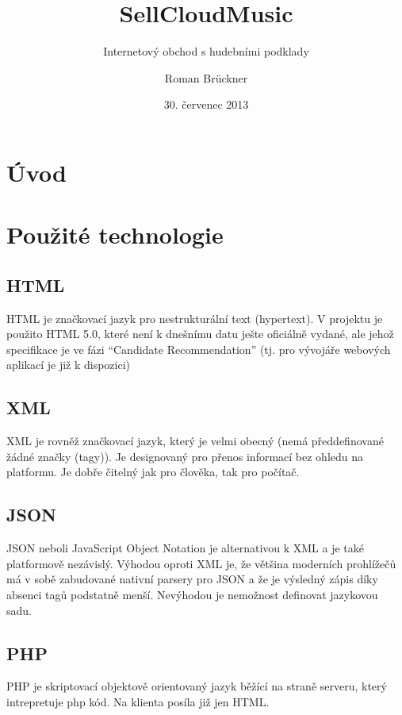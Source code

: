 \documentclass[12pt]{article}
\title{SellCloudMusic}
\subtitle{Internetový obchod s hudebními podklady}
\author{Roman Brückner}
\date{30. červenec 2013}
\begin{document}
\maketitle
\newpage


\section{Úvod}




\section{Použité technologie}

\subsection{HTML}
HTML je značkovací jazyk pro nestrukturální text (hypertext). V projektu je použito HTML 5.0, které není k dnešnímu datu ješte oficiálně vydané, ale jehož specifikace je ve fázi ``Candidate Recommendation'' (tj. pro vývojáře webových aplikací je již k dispozici)\cite{w3cHTML5}

\subsection{XML}
XML je rovněž značkovací jazyk, který je velmi obecný (nemá předdefinované žádné značky (tagy)). Je designovaný pro přenos informací bez ohledu na platformu. Je dobře čitelný jak pro člověka, tak pro počítač.

\subsection{JSON}
JSON neboli JavaScript Object Notation je alternativou k XML a je také platformově nezávislý. Výhodou oproti XML je, že většina moderních prohlížečů má v sobě zabudované nativní parsery pro JSON a že je výsledný zápis díky absenci tagů podstatně menší. Nevýhodou je nemožnost definovat jazykovou sadu.

\subsection{PHP}
PHP je skriptovací objektově orientovaný jazyk běžící na straně serveru, který intrepretuje php kód. Na klienta posíla již jen HTML.
\end{document}
